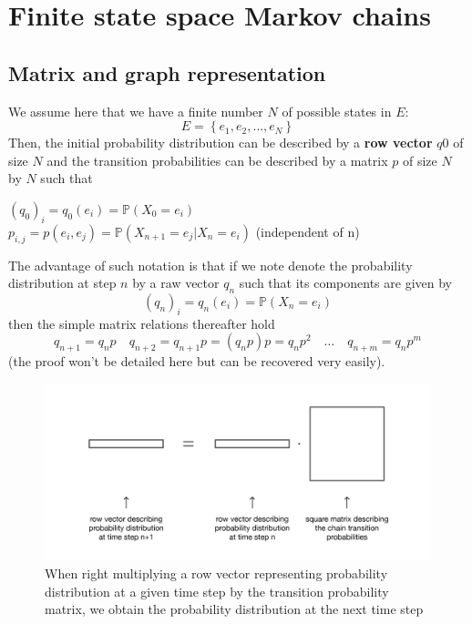 \section{Finite state space Markov chains}
\subsection{Matrix and graph representation}

We assume here that we have a finite number $N$ of possible states in $E$:
\begin{equation}E=\left\{e_{1}, e_{2}, \dots, e_{N}\right\}\end{equation}
Then, the initial probability distribution can be described by a \textbf{row vector} $q0$ of size $N$ and the transition probabilities can be described by a matrix $p$ of size $N$ by $N$ such that

$\left(q_{0}\right)_{i}=q_{0}\left(e_{i}\right)=\mathbb{P}\left(X_{0}=e_{i}\right)$\\
$p_{i, j}=p\left(e_{i}, e_{j}\right)=\mathbb{P}\left(X_{n+1}=e_{j} | X_{n}=e_{i}\right)$
(independent of n)

The advantage of such notation is that if we note denote the probability distribution at step $n$ by a raw vector $q_n$ such that its components are given by
\begin{equation}
\left(q_{n}\right)_{i}=q_{n}\left(e_{i}\right)=\mathbb{P}\left(X_{n}=e_{i}\right)
\end{equation}
then the simple matrix relations thereafter hold
\begin{equation}
q_{n+1}=q_{n} p \quad q_{n+2}=q_{n+1} p=\left(q_{n} p\right) p=q_{n} p^{2} \quad \ldots \quad q_{n+m}=q_{n} p^{m}
\end{equation}
(the proof won't be detailed here but can be recovered very easily).

\begin{figure}[h]
    \centering
\includegraphics[width=\textwidth]{pic/p05c06-snip03.png}
    \caption[Obtain the probability distribution for the next time step]{When right multiplying a row vector representing probability distribution at a given time step by the transition probability matrix, we obtain the probability distribution at the next time step}
    \label{fig:p05c06-snip03}
\end{figure}

